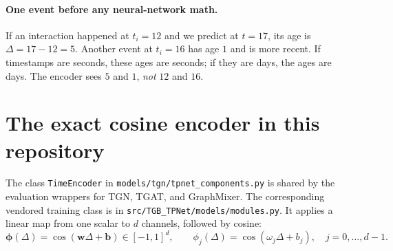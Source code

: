 \documentclass[11pt]{article}
\begin{document}
\paragraph{One event before any neural-network math.}
If an interaction happened at $t_i=12$ and we predict at $t=17$, its age is $\Delta=17-12=5$. Another event at $t_i=16$ has age $1$ and is more recent. If timestamps are seconds, these ages are seconds; if they are days, the ages are days. The encoder sees $5$ and $1$, \emph{not} $12$ and $16$.

\section{The exact cosine encoder in this repository}
The class \texttt{TimeEncoder} in \texttt{models/tgn/tpnet\_components.py} is shared by the evaluation wrappers for TGN, TGAT, and GraphMixer. The corresponding vendored training class is in \texttt{src/TGB\_TPNet/models/modules.py}. It applies a linear map from one scalar to $d$ channels, followed by cosine:
\begin{equation}\label{eq:encoder}
\boldsymbol{\phi}(\Delta)
=\cos(\mathbf{w}\Delta+\mathbf{b})\in[-1,1]^d,
\qquad
\phi_j(\Delta)=\cos(\omega_j\Delta+b_j),\quad j=0,\ldots,d-1.
\end{equation}
\end{document}
